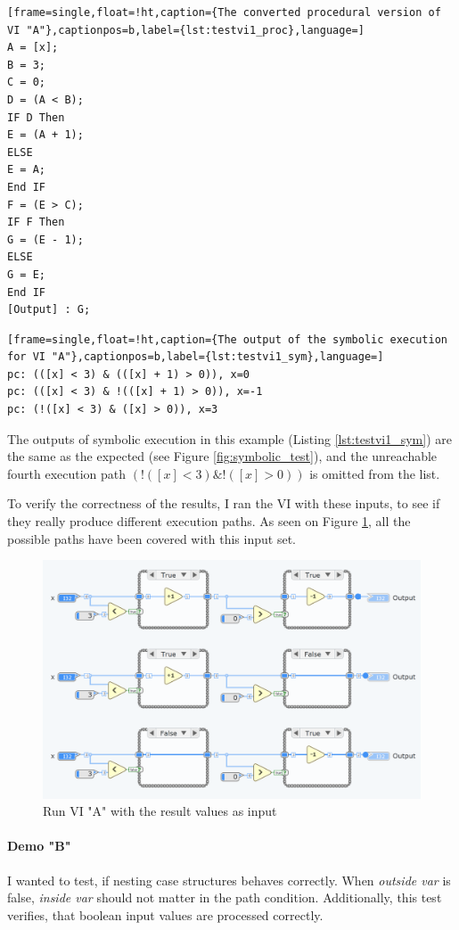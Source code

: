 \begin{lstlisting}[frame=single,float=!ht,caption={The converted procedural version of VI "A"},captionpos=b,label={lst:testvi1_proc},language=]
A = [x]; 
B = 3; 
C = 0; 
D = (A < B); 
IF D Then
E = (A + 1); 
ELSE
E = A; 
End IF
F = (E > C); 
IF F Then
G = (E - 1); 
ELSE
G = E; 
End IF
[Output] : G; 
\end{lstlisting}

\begin{lstlisting}[frame=single,float=!ht,caption={The output of the symbolic execution for VI "A"},captionpos=b,label={lst:testvi1_sym},language=]
pc: (([x] < 3) & (([x] + 1) > 0)), x=0
pc: (([x] < 3) & !(([x] + 1) > 0)), x=-1
pc: (!([x] < 3) & ([x] > 0)), x=3
\end{lstlisting}

The outputs of symbolic execution in this example (Listing \ref{lst:testvi1_sym}) are the same as the expected (see Figure \ref{fig:symbolic_test}), and the unreachable fourth execution path $(!([x] < 3) \& !([x] > 0))$ is omitted from the list.

To verify the correctness of the results, I ran the VI with these inputs, to see if they really produce different execution paths. As seen on Figure \ref{fig:verify1}, all the possible paths have been covered with this input set.
\begin{figure}
\centering
\includegraphics[width=140mm,keepaspectratio]{figures/verify1.png}
\caption{Run VI "A" with the result values as input} 
\label{fig:verify1}
\end{figure}

\paragraph{Demo "B"}
I wanted to test, if nesting case structures behaves correctly. When \textit{outside var} is false, \textit{inside var} should not matter in the path condition. Additionally, this test verifies, that boolean input values are processed correctly.

